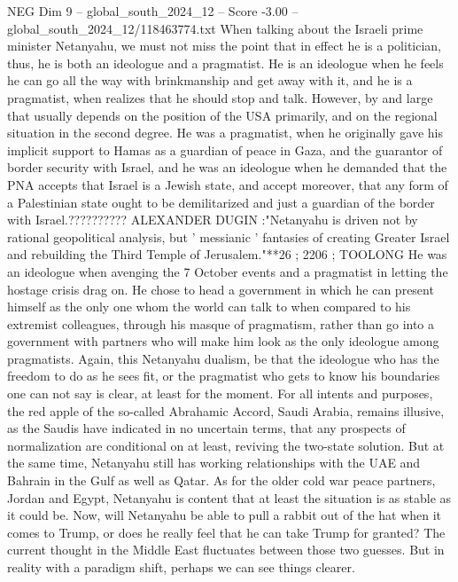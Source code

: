 \begin{textsample}{NEG Dim 9 – global\_south\_2024\_12 – Score -3.00 – global\_south\_2024\_12/118463774.txt}  \label{ex:f9_neg_130}
When talking about the Israeli prime minister Netanyahu, we must not miss the point that in effect he is a politician, thus, he is both an ideologue and a pragmatist.
He is an ideologue when he feels he can go all the way with brinkmanship and get away with it, and he is a pragmatist, when realizes that he should stop and talk.
However, by and large that usually depends on the position of the USA primarily, and on the regional situation in the second degree.
He was a pragmatist, when he originally gave his implicit support to Hamas as a guardian of peace in Gaza, and the guarantor of border security with Israel, and he was an ideologue when he demanded that the PNA accepts that Israel is a Jewish state, and accept moreover, that any form of a Palestinian state ought to be demilitarized and just a guardian of the border with Israel.??????????
ALEXANDER DUGIN :"Netanyahu is driven not by rational geopolitical analysis, but ' messianic ' fantasies of creating Greater Israel and rebuilding the Third Temple of Jerusalem."**26 ; 2206 ; TOOLONG He was an ideologue when avenging the 7 October events and a pragmatist in letting the hostage crisis drag on.
He chose to head a government in which he can present himself as the only one whom the world can talk to when compared to his extremist colleagues, through his masque of pragmatism, rather than go into a government with partners who will make him look as the only ideologue among pragmatists.
Again, this Netanyahu dualism, be that the ideologue who has the freedom to do as he sees fit, or the pragmatist who gets to know his boundaries one can not say is clear, at least for the moment.
For all intents and purposes, the red apple of the so-called Abrahamic Accord, Saudi Arabia, remains illusive, as the Saudis have indicated in no uncertain terms, that any prospects of normalization are conditional on at least, reviving the two-state solution.
But at the same time, Netanyahu still has working relationships with the UAE and Bahrain in the Gulf as well as Qatar.
As for the older cold war peace partners, Jordan and Egypt, Netanyahu is content that at least the situation is as stable as it could be.
Now, will Netanyahu be able to pull a rabbit out of the hat when it comes to Trump, or does he really feel that he can take Trump for granted?
The current thought in the Middle East fluctuates between those two guesses.
But in reality with a paradigm shift, perhaps we can see things clearer.

\end{textsample}
